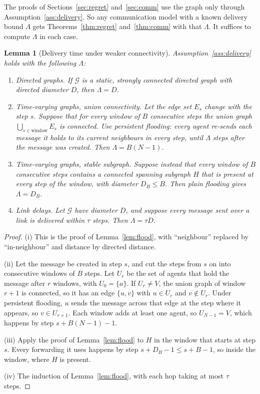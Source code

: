 \documentclass[11pt]{article}
\newtheorem{lemma}[theorem]{Lemma}
\theoremstyle{definition}
\newcommand{\cG}{\mathcal{G}}
\begin{document}
The proofs of Sections~\ref{sec:regret} and~\ref{sec:comm} use the graph only through Assumption~\ref{ass:delivery}.
So any communication model with a known delivery bound $\Lambda$ gets Theorems~\ref{thm:regret} and~\ref{thm:comm}
with that $\Lambda$. It suffices to compute $\Lambda$ in each case.

\begin{lemma}[Delivery time under weaker connectivity]\label{lem:delivery}
Assumption~\ref{ass:delivery} holds with the following $\Lambda$:
\begin{enumerate}[nosep,label=(\roman*)]
\item \emph{Directed graphs.} If $\cG$ is a static, strongly connected directed graph with directed diameter $D$,
then $\Lambda=D$.
\item \emph{Time-varying graphs, union connectivity.} Let the edge set $E_s$ change with the step $s$. Suppose that for
every window of $B$ consecutive steps the union graph $\bigcup_{s\in\text{window}}E_s$ is connected. Use
\emph{persistent flooding}: every agent re-sends each message it holds to its current neighbours in every step, until
$\Lambda$ steps after the message was created. Then $\Lambda=B(N-1)$.
\item \emph{Time-varying graphs, stable subgraph.} Suppose instead that every window of $B$ consecutive steps contains a
connected spanning subgraph $H$ that is present at every step of the window, with diameter $D_B\le B$. Then plain
flooding gives $\Lambda=D_B$.
\item \emph{Link delays.} Let $\cG$ have diameter $D$, and suppose every message sent over a link is delivered within
$\tau$ steps. Then $\Lambda=\tau D$.
\end{enumerate}
\end{lemma}
\begin{proof}
(i) This is the proof of Lemma~\ref{lem:flood}, with ``neighbour'' replaced by ``in-neighbour'' and distance by
directed distance.

(ii) Let the message be created in step $s$, and cut the steps from $s$ on into consecutive windows of $B$ steps. Let
$U_r$ be the set of agents that hold the message after $r$ windows, with $U_0=\{a\}$. If $U_r\neq V$, the union graph
of window $r+1$ is connected, so it has an edge $\{u,v\}$ with $u\in U_r$ and $v\notin U_r$. Under persistent
flooding, $u$ sends the message across that edge at the step where it appears, so $v\in U_{r+1}$. Each window adds at
least one agent, so $U_{N-1}=V$, which happens by step $s+B(N-1)-1$.

(iii) Apply the proof of Lemma~\ref{lem:flood} to $H$ in the window that starts at step $s$. Every forwarding it uses
happens by step $s+D_B-1\le s+B-1$, so inside the window, where $H$ is present.

(iv) The induction of Lemma~\ref{lem:flood}, with each hop taking at most $\tau$ steps.
\end{proof}
\end{document}

